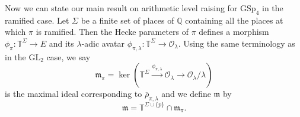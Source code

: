 \documentclass[10pt]{amsart}
\numberwithin{equation}{section}
\theoremstyle{definition}
\def\GL{\mathrm{GL}}
\def\GSp{\mathrm{GSp}}
\def\calO{\mathcal{O}}
\def\fracm{\mathfrak{m}}
\def\QQ{\mathbb{Q}}
\def\TT{\mathbb{T}}
\begin{document}
Now we can state our main result on arithmetic level raising for $\GSp_{4}$ in the ramified case. Let $\Sigma$ be a finite set of places of $\QQ$ containing all the places at which $\pi$ is ramified. Then the Hecke parameters of $\pi$ defines a morphism $\phi_{\pi}: \TT^{\Sigma}\rightarrow E$ and its $\lambda$-adic avatar $\phi_{\pi, \lambda}: \TT^{\Sigma}\rightarrow \calO_{\lambda}$. Using the same terminology as in the $\GL_{2}$ case, we say
\begin{equation*}
\fracm_{\pi}=\ker(\TT^{\Sigma}\xrightarrow{\phi_{\pi,\lambda}}\calO_{\lambda}\rightarrow\calO_{\lambda}/\lambda)
\end{equation*}
is the maximal ideal corresponding to $\overline{\rho}_{\pi,\lambda}$ and we define $\fracm$ by
\begin{equation*}
\fracm=\TT^{\Sigma\cup\{p\}}\cap \fracm_{\pi}.
\end{equation*}
\end{document}
